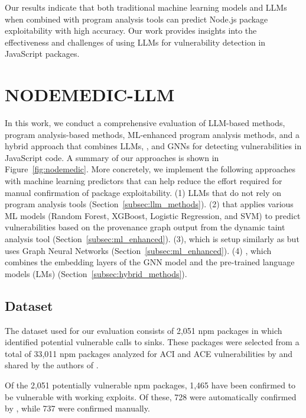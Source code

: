 \documentclass[12pt,openany,oneside,table]{cmuthesis}
\begin{document}
Our results indicate that 
both traditional machine learning models and LLMs when combined with program analysis tools can predict Node.js package exploitability with high accuracy.
Our work provides insights into the effectiveness and challenges of using LLMs for vulnerability detection in JavaScript packages.








\section{NODEMEDIC-LLM}
In this work, we conduct a comprehensive evaluation of LLM-based methods, program analysis-based methods, ML-enhanced program analysis methods, and a hybrid approach that combines LLMs, \nodemedicfine, and GNNs for detecting vulnerabilities in JavaScript code.
A summary of our approaches is shown in Figure~\ref{fig:nodemedic}.
More concretely, we implement the following approaches with machine learning predictors that can help reduce the effort required for manual confirmation of package exploitability. (1) LLMs that do not rely on program analysis tools (Section~\ref{subsec:llm_methods}). (2)  that applies various ML models (Random Forest, XGBoost, Logistic Regression, and SVM) to predict vulnerabilities based on the provenance graph output from the dynamic taint analysis tool \nodemedicfine (Section~\ref{subsec:ml_enhanced}). 
(3), which is setup similarly as  but uses Graph Neural Networks (Section~\ref{subsec:ml_enhanced}). 
(4) , which combines the embedding layers of the GNN model and the pre-trained language models (LMs) (Section~\ref{subsec:hybrid_methods}).


\subsection{Dataset}\label{subsec:datasets}
The dataset used for our evaluation consists of 2,051 npm packages in which \nodemedicfine identified potential vulnerable calls to sinks. These packages were selected from a total of 33,011 npm packages analyzed for ACI and ACE vulnerabilities by \nodemedicfine and shared by the authors of \nodemedicfine.

Of the 2,051 potentially vulnerable npm packages, 1,465 have been confirmed to be vulnerable with working exploits. Of these, 728 were automatically confirmed by \nodemedicfine, while 737 were confirmed manually. 
\end{document}
